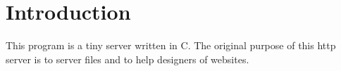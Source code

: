 \hypertarget{index_Introduction}{}\section{Introduction}\label{index_Introduction}
This program is a tiny server written in C. The original purpose of this http server is to server files and to help designers of websites. 